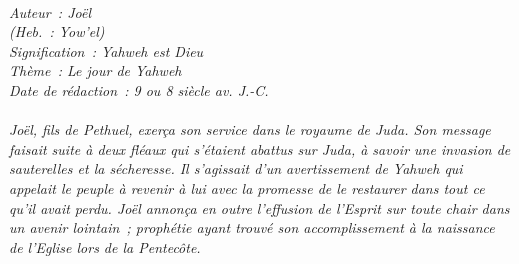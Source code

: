 \BFont
\noindent\hrulefill
{\footnotesize
\textit{
\bigskip
{\centering{}
\\Auteur~: Joël
\\(Heb.~: Yow'el)
\\Signification~: Yahweh est Dieu
\\Thème~: Le jour de Yahweh
\\Date de rédaction~: 9 ou 8 siècle av. J.-C.\\}
}
\textit{
\\Joël, fils de Pethuel, exerça son service dans le royaume de Juda. Son message faisait suite à deux fléaux qui s'étaient abattus sur Juda, à savoir une invasion de sauterelles et la sécheresse. Il s'agissait d'un avertissement de Yahweh qui appelait le peuple à revenir à lui avec la promesse de le restaurer dans tout ce qu'il avait perdu. Joël annonça en outre l'effusion de l'Esprit sur toute chair dans un avenir lointain~; prophétie ayant trouvé son accomplissement à la naissance de l'Eglise lors de la Pentecôte.\bigskip
}
}
\par\nobreak\noindent\hrulefill
